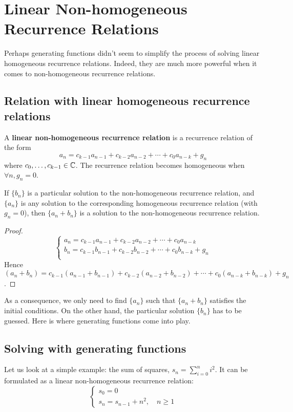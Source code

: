 \documentclass[a4paper, 12pt]{report}
\begin{document}
\section{Linear Non-homogeneous Recurrence Relations}Perhaps generating functions didn't seem to simplify the process of solving linear homogeneous recurrence relations. Indeed, they are much more powerful when it comes to non-homogeneous recurrence relations.

\subsection{Relation with linear homogeneous recurrence relations}
\begin{defn}
A \textbf{linear non-homogeneous recurrence relation} is a recurrence relation of the form
\[a_n = c_{k - 1}a_{n - 1} + c_{k - 2}a_{n - 2} + \cdots + c_0 a_{n - k} + g_n\]
where $c_0, \dots, c_{k - 1} \in \mathbb{C}$. The recurrence relation becomes homogeneous when $\forall n, g_n = 0$.
\end{defn}

\begin{prop}
If $\{b_n\}$ is a particular solution to the non-homogeneous recurrence relation, and $\{a_n\}$ is any solution to the corresponding homogeneous recurrence relation (with $g_n = 0$), then $\{a_n + b_n\}$ is a solution to the non-homogeneous recurrence relation.
\end{prop}

\begin{proof}
\[\begin{cases}
    a_n = c_{k - 1}a_{n - 1} + c_{k - 2}a_{n - 2} + \cdots + c_0 a_{n - k} \\
    b_n = c_{k - 1}b_{n - 1} + c_{k - 2}b_{n - 2} + \cdots + c_0 b_{n - k} + g_n\\
    \end{cases}
\]
Hence $(a_n + b_n) = c_{k - 1}(a_{n - 1} + b_{n - 1}) + c_{k - 2}(a_{n - 2} + b_{n - 2}) + \cdots + c_0 (a_{n - k} + b_{n - k}) + g_n$.
\end{proof}
As a consequence, we only need to find $\{a_n\}$ such that $\{a_n + b_n\}$ satisfies the initial conditions. On the other hand, the particular solution $\{b_n\}$ has to be guessed. Here is where generating functions come into play.

\subsection{Solving with generating functions}
Let us look at a simple example: the sum of squares, $s_n = \sum_{i = 0}^n i^2$. It can be formulated as a linear non-homogeneous recurrence relation:
\[
\begin{cases}
s_0 = 0\\
s_n = s_{n - 1} + n^2, \quad n \geq 1
\end{cases}
\]
\end{document}
